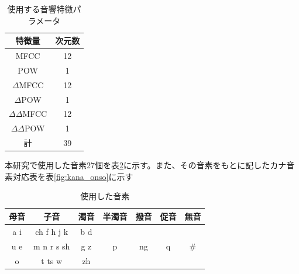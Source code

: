 \begin{table}[H]
  \begin{center}
    \caption{使用する音響特徴パラメータ \label{acoustic_model_feature}}
    \begin{tabular}{|c||c|} \hline
      特徴量 & 次元数\\ \hline
      MFCC & 12  \\ \hline
      POW & 1  \\ \hline
      $\Delta$MFCC & 12 \\ \hline
      $\Delta$POW & 1 \\ \hline
      $\Delta\Delta$MFCC & 12 \\ \hline
      $\Delta\Delta$POW & 1 \\ \hline
      計 & 39 \\ \hline
    \end{tabular}
  \end{center}
\end{table}



\vspace{0.2in}\par
本研究で使用した音素27個を表\ref{fig:used_onso}に示す。また、その音素をもとに記したカナ音素対応表を表\ref{fig:kana_onso}に示す


\begin{table}[H]
\begin{center}
\caption{使用した音素 \label{fig:used_onso}}
\begin{tabular}{|c|c|c|c|c|c|c|}
\hline
母音  & 子音         & 濁音  & 半濁音 & 撥音 & 促音 & 無音 \\ \hline
a i & ch f h j k & b d &     &    &    &    \\ 
u e & m n r s sh & g z & p   & ng & q  & \# \\ 
o   & t ts w     & zh  &     &    &    &    \\ \hline
\end{tabular}
\end{center}
\end{table}


